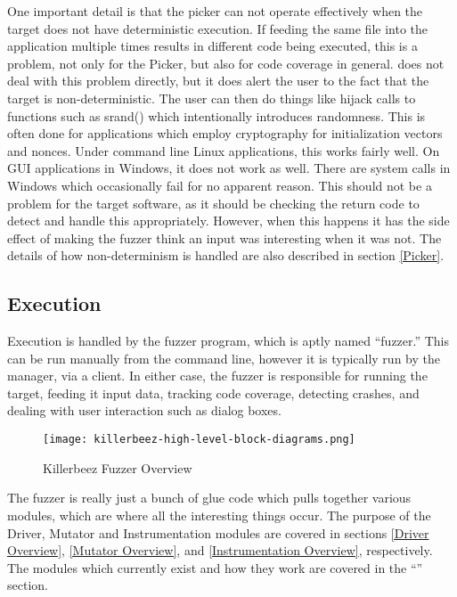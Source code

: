 One important detail is that the picker can not operate effectively when the
target does not have deterministic execution.  If feeding the same file into
the application multiple times results in different code being executed, this
is a problem, not only for the Picker, but also for code coverage in general.
\AFL{} does not deal with this problem directly, but it does alert the user to
the fact that the target is non-deterministic. The user can then do things like
hijack calls to functions such as srand() which intentionally introduces
randomness. This is often done for applications which employ cryptography for
initialization vectors and nonces. Under command line Linux applications, this
works fairly well.  On GUI applications in Windows, it does not work as well.
There are system calls in Windows which occasionally fail for no apparent reason. This
should not be a problem for the target software, as it should be checking the return code to
detect and handle this appropriately.  However, when this happens it has the
side effect of making the fuzzer think an input was interesting when it was
not.  The details of how non-determinism is handled are also described in
section \ref{Picker}.

\subsection{Execution}
Execution is handled by the fuzzer program, which is aptly named ``fuzzer.''
This can be run manually from the command line, however it is typically run by
the manager, via a \BOINC{} client.  In either case, the fuzzer is responsible
for running the target, feeding it input data, tracking code
coverage, detecting crashes, and dealing with user interaction such as dialog
boxes.

\begin{figure*}[htb]
\centering
\texttt{[image: killerbeez-high-level-block-diagrams.png]}
\caption{Killerbeez Fuzzer Overview}
\label{fig:Killerbeez-fuzzer-overview}
\end{figure*}

The fuzzer is really just a bunch of glue code which pulls together various
modules, which are where all the interesting things occur. The purpose of
the Driver, Mutator and Instrumentation modules are covered in sections
\ref{Driver Overview}, \ref{Mutator Overview}, and
\ref{Instrumentation Overview}, respectively.  The modules which currently
exist and how they work are covered in the ``''
section.

